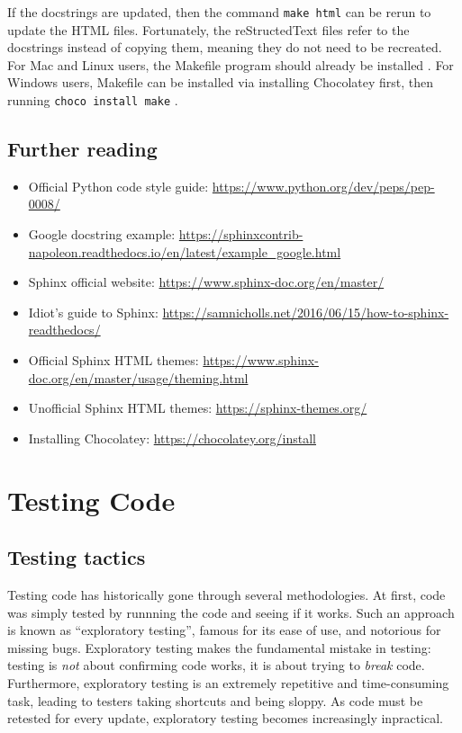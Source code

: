 \documentclass[11pt]{article}
\begin{document}
If the docstrings are updated, then the command \texttt{make html} can be rerun to update the HTML files. Fortunately, the reStructedText files refer to the docstrings instead of copying them, meaning they do not need to be recreated. For Mac and Linux users, the Makefile program should already be installed \cite{makefile}. For Windows users, Makefile can be installed via installing Chocolatey first, then running \texttt{choco install make} \cite{chocolatey}.

\subsection{Further reading}

\begin{itemize}
    \item Official Python code style guide: \url{https://www.python.org/dev/peps/pep-0008/}
    \item Google docstring example: \url{https://sphinxcontrib-napoleon.readthedocs.io/en/latest/example_google.html}
    \item Sphinx official website: \url{https://www.sphinx-doc.org/en/master/}
    \item Idiot's guide to Sphinx: \url{https://samnicholls.net/2016/06/15/how-to-sphinx-readthedocs/}
    \item Official Sphinx HTML themes: \url{https://www.sphinx-doc.org/en/master/usage/theming.html}
    \item Unofficial Sphinx HTML themes: \url{https://sphinx-themes.org/}
    \item Installing Chocolatey: \url{https://chocolatey.org/install}
\end{itemize}

\newpage

\section{Testing Code}

\subsection{Testing tactics}

Testing code has historically gone through several methodologies. At first, code was simply tested by runnning the code and seeing if it works. Such an approach is known as ``exploratory testing'', famous for its ease of use, and notorious for missing bugs. Exploratory testing makes the fundamental mistake in testing: testing is \textit{not} about confirming code works, it is about trying to \textit{break} code. Furthermore, exploratory testing is an extremely repetitive and time-consuming task, leading to testers taking shortcuts and being sloppy. As code must be retested for every update, exploratory testing becomes increasingly inpractical.
\end{document}
